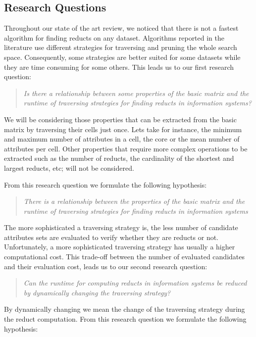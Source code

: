 \documentclass[authoryear,11pt]{elsarticle}
\begin{document}
\subsection{Research Questions}\label{ResearchQuestions} 
  Throughout our state of the art review, we noticed that there is not a fastest algorithm for finding reducts 
  on any dataset. Algorithms reported in the literature use different strategies for traversing and pruning 
  the whole search space. Consequently, some strategies are better suited for some datasets while they are time
  consuming for some others. This leads us to our first research question:
  
\begin{quote}
  \emph{Is there a relationship between some properties of the basic matrix and the runtime 
  		of traversing strategies for finding reducts in information systems?}
\end{quote}
  		
  We will be considering those properties that can be extracted from the basic matrix by traversing their 
  cells just once. Lets take for instance, the minimum and maximum number of attributes in a cell, the 
  core or the mean number of attributes per cell. Other properties that require more complex operations to 
  be extracted such as the number of reducts, the cardinality of the shortest and largest reducts, etc; 
  will not be considered.
  
  From this research question we formulate the following hypothesis:
  
\begin{quote}  
  \emph{There is a relationship between the properties of the basic matrix and the runtime 
  		of traversing strategies for finding reducts in information systems}
\end{quote}
  
  The more sophisticated a traversing strategy is, the less number of candidate attributes sets are 
  evaluated to verify whether they are reducts or not. Unfortunately, a more sophisticated traversing 
  strategy has usually a higher computational cost. This trade-off between the number of evaluated 
  candidates and their evaluation cost, leads us to our second research question:
  
\begin{quote}
  \emph{Can the runtime for computing reducts in information systems be reduced by 
  		dynamically changing the traversing strategy?}
\end{quote}
  By dynamically changing we mean the change of the traversing strategy during the reduct computation.
  From this research question we formulate the following hypothesis:
    
\end{document}
